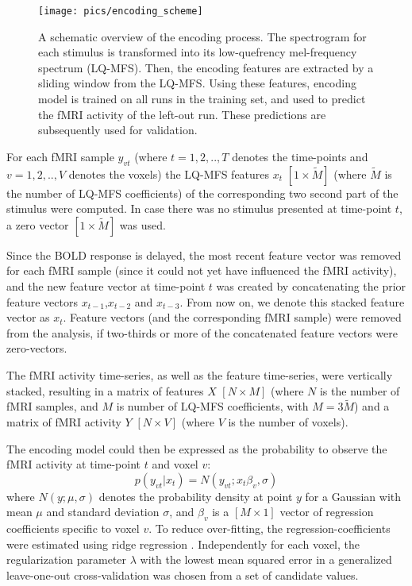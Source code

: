 \begin{figure}
  \centering
  \texttt{[image: pics/encoding\_scheme]}

  \caption{A schematic overview of the encoding process. The spectrogram for
	  each stimulus is transformed into its low-quefrency mel-frequency
	  spectrum (LQ-MFS). Then, the encoding features are extracted by a
  sliding window from the LQ-MFS. Using these features, encoding model is trained on all runs in
  the training set, and used to predict the f{MRI} activity of the left-out run.
  These predictions are subsequently used for validation.}

 \label{fig:encoding_scheme}
\end{figure}


For each f{MRI} sample $y_{vt}$ (where $t=1,2,..,T$ denotes the time-points and
$v=1,2,..,V$ denotes the voxels) the LQ-MFS features $x_{t}$ $[1\times\widetilde{M}]$
(where $\widetilde{M}$ is the number of LQ-MFS coefficients) of the
corresponding two second part of the stimulus were computed. In case there was
no stimulus presented at time-point $t$, a zero vector $[1\times\widetilde{M}]$ was
used. 

Since the BOLD response is delayed,  the most recent feature vector was removed
for each f{MRI} sample (since it could not yet have influenced the f{MRI}
activity), and the new feature vector at time-point $t$ was created by
concatenating the prior feature vectors $x_{t-1}$,$x_{t-2}$ and $x_{t-3}$. From
now on, we denote this stacked feature vector as $x_{t}$.
Feature vectors (and the corresponding f{MRI} sample) were removed from the
analysis, if two-thirds or more of the concatenated feature vectors were
zero-vectors.

The f{MRI} activity time-series, as well as the feature time-series, were
vertically stacked, resulting in a matrix of features $X$ $[N\times M]$ (where $N$ is
the number of f{MRI} samples, and $M$ is number of LQ-MFS coefficients, with
$M=3\widetilde{M}$) and a matrix of f{MRI} activity $Y$ $[N\times V]$ (where $V$ is
the number of voxels).

The encoding model could then be expressed as the probability to observe the f{MRI} activity at time-point $t$ and voxel $v$:
%
\begin{equation}
  \label{eq:encmo}
  p(y_{vt}|x_{t}) = N(y_{vt};x_{t}\beta_{v},\sigma)
\end{equation}
%
where $N(y;\mu,\sigma)$ denotes the probability density at point $y$ for a
Gaussian with mean $\mu$ and standard deviation $\sigma$, and $\beta_{v}$ is a
$[M\times1]$ vector of regression coefficients specific to voxel $v$. To reduce
over-fitting, the regression-coefficients were estimated using ridge regression
\citep{HK70}.  Independently for each voxel, the regularization parameter
$\lambda$ with the lowest mean squared error in a generalized leave-one-out
cross-validation \citep{GHW79} was chosen from a set of candidate values.

